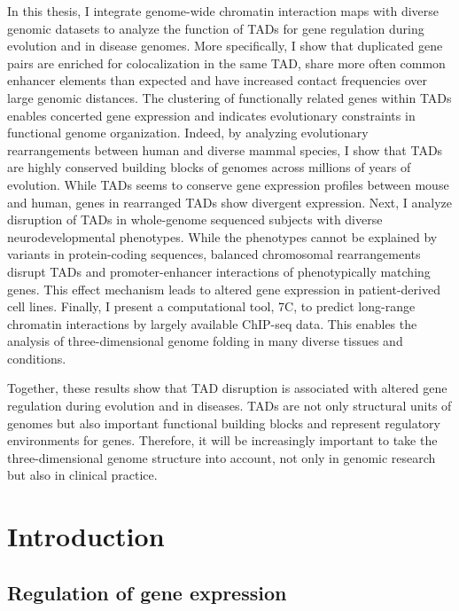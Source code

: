 \documentclass[a4paper,twoside=true,openright,parskip=full,chapterprefix=true,11pt,headings=normal,bibliography=totoc,listof=totoc,titlepage=on,captions=tableabove,draft=false]{scrreprt}
\theoremstyle{definition}
\theoremstyle{definition}
\theoremstyle{definition}
\theoremstyle{remark}
\begin{document}
In this thesis, I integrate genome-wide chromatin interaction maps with
diverse genomic datasets to analyze the function of TADs for gene
regulation during evolution and in disease genomes. More specifically, I
show that duplicated gene pairs are enriched for colocalization in the
same TAD, share more often common enhancer elements than expected and
have increased contact frequencies over large genomic distances. The
clustering of functionally related genes within TADs enables concerted
gene expression and indicates evolutionary constraints in functional
genome organization. Indeed, by analyzing evolutionary rearrangements
between human and diverse mammal species, I show that TADs are highly
conserved building blocks of genomes across millions of years of
evolution. While TADs seems to conserve gene expression profiles between
mouse and human, genes in rearranged TADs show divergent expression.
Next, I analyze disruption of TADs in whole-genome sequenced subjects
with diverse neurodevelopmental phenotypes. While the phenotypes cannot
be explained by variants in protein-coding sequences, balanced
chromosomal rearrangements disrupt TADs and promoter-enhancer
interactions of phenotypically matching genes. This effect mechanism
leads to altered gene expression in patient-derived cell lines. Finally,
I present a computational tool, 7C, to predict long-range chromatin
interactions by largely available ChIP-seq data. This enables the
analysis of three-dimensional genome folding in many diverse tissues and
conditions.

Together, these results show that TAD disruption is associated with
altered gene regulation during evolution and in diseases. TADs are not
only structural units of genomes but also important functional building
blocks and represent regulatory environments for genes. Therefore, it
will be increasingly important to take the three-dimensional genome
structure into account, not only in genomic research but also in
clinical practice.

\hypertarget{thesis-intro}{%
\chapter{Introduction}\label{thesis-intro}}

\hypertarget{regulation-of-gene-expression}{%
\section{Regulation of gene
expression}\label{regulation-of-gene-expression}}
\end{document}

